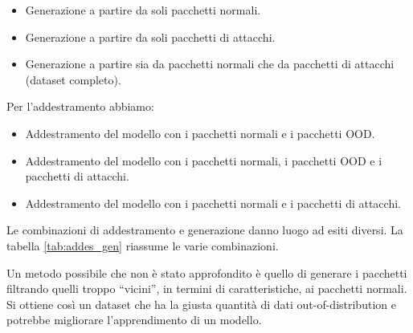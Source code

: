 \begin{itemize}
  \item Generazione a partire da soli pacchetti normali.
  \item Generazione a partire da soli pacchetti di attacchi.
  \item Generazione a partire sia da pacchetti normali che da pacchetti di attacchi (dataset completo).
\end{itemize}

Per l'addestramento abbiamo:

\begin{itemize}
  \item Addestramento del modello con i pacchetti normali e i pacchetti OOD.
  \item Addestramento del modello con i pacchetti normali, i pacchetti OOD e i pacchetti di attacchi.
  \item Addestramento del modello con i pacchetti normali e i pacchetti di attacchi.
\end{itemize}

Le combinazioni di addestramento e generazione danno luogo ad esiti diversi. La tabella \ref{tab:addes_gen} riassume le varie combinazioni.

\begin{table}\centering\setlength\tabcolsep{3.5pt}\renewcommand{}
  \noindent{}
\caption{\label{tab:addes_gen} Combinazioni di generazione dei pacchetti e addestramento del modello, dove N = pacchetti normali, AV = pacchetti di attacchi veri, CMP = pacchetti normali + pacchetti di attacchi, OOD = pacchetti generati. Si trova poi AV OOD, N OOD, N+AV OOD, rispettivamente dati generati a partire da attacchi, dati generati a partire da pacchetti normali, dati generati a partire dal dataset completo}
\end{table}


Un metodo possibile che non è stato approfondito è quello di generare i pacchetti filtrando quelli troppo ``vicini'', in termini di caratteristiche, ai pacchetti normali. Si ottiene così un dataset che ha la giusta quantità di dati out-of-distribution e potrebbe migliorare l'apprendimento di un modello.

